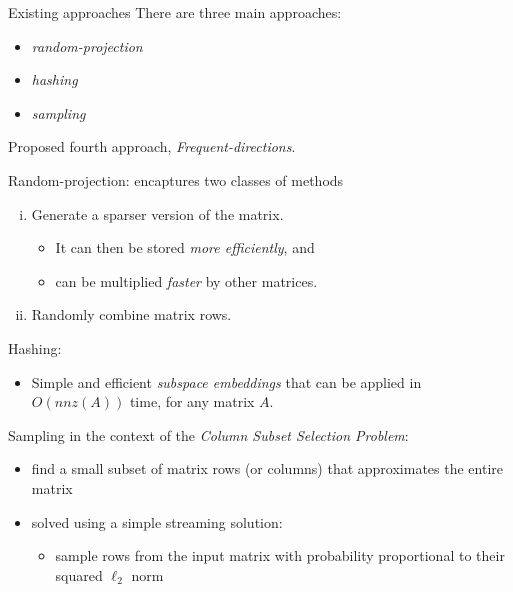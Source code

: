 \documentclass[first=dgreen,second=purple,logo=redque]{aaltoslides}
\begin{document}
\begin{frame}[allowframebreaks=1]{Existing approaches}
There are three main approaches:
\begin{itemize}
\item \textit{random-projection}
\item \textit{hashing}
\item \textit{sampling}
\end{itemize}

Proposed fourth approach, \textit{Frequent-directions}.

\framebreak

Random-projection: encaptures two classes of methods
\begin{enumerate}[(i)]
  \item Generate a sparser version of the matrix.
   \begin{itemize}
   \item It can then be stored \textit{more efficiently}, and
   \item can be multiplied \textit{faster} by other matrices.
    \end{itemize}
  \item Randomly combine matrix rows.
\end{enumerate}

\framebreak

Hashing:
\begin{itemize}
  \item Simple and efficient \textit{subspace embeddings}
     that can be applied in $O(nnz(A))$ time, for any matrix $A$.
\end{itemize}

\framebreak

Sampling in the context of the \textit{Column Subset Selection Problem}:
\begin{itemize}
  \item find a small subset of matrix rows (or columns) that approximates
  the entire matrix
  \item solved using a simple streaming solution:
   \begin{itemize}
   \item sample rows from the input matrix with probability proportional to
   their squared $\ell_{2}$ norm
   \end{itemize}
\end{itemize}
\end{frame}

\end{document}
